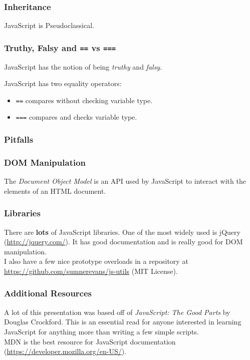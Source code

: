 \documentclass{lug}
\begin{document}
\begin{frame}
    \frametitle{Inheritance}
    JavaScript is Pseudoclassical.

\end{frame}

\begin{frame}
    \frametitle{Truthy, Falsy and \texttt{==} vs \texttt{===}}

    JavaScript has the notion of being \textit{truthy} and \textit{falsy}.

    JavaScript has two equality operators:
    \begin{itemize}
        \item \texttt{==} compares without checking variable type.
        \item \texttt{===} compares and checks variable type.
    \end{itemize}
\end{frame}

\begin{frame}
    \frametitle{Pitfalls}

\end{frame}

\begin{frame}
    \frametitle{DOM Manipulation}

    The \textit{Document Object Model} is an API used by JavaScript to interact with the elements of
    an HTML document.\footnotemark[1]

\end{frame}

\begin{frame}
    \frametitle{Libraries}

    There are \textbf{lots} of JavaScript libraries. One of the most widely used is jQuery
    (\url{http://jquery.com/}). It has good documentation and is really good for DOM
    manipulation.\\

    I also have a few nice prototype overloads in a repository at
    \url{https://github.com/sumnerevans/js-utils} (MIT License).

\end{frame}

\begin{frame}
    \frametitle{Additional Resources}

    A lot of this presentation was based off of \textit{JavaScript: The Good Parts} by Douglas
    Crockford. This is an essential read for anyone interested in learning JavaScript for anything
    more than writing a few simple scripts.\\

    MDN is the best resource for JavaScript documentation
    (\url{https://developer.mozilla.org/en-US/}).
\end{frame}
\end{document}
